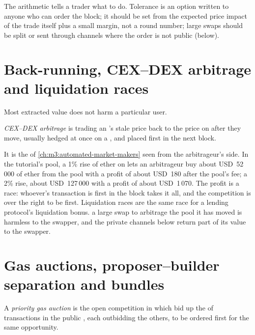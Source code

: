 The arithmetic tells a trader what to do. Tolerance is an option written to anyone who can order the block; it should be set from the
expected price impact of the trade itself plus a small margin, not a round number; large swaps should be split or sent through channels
where the order is not public (below).

\section{Back-running, CEX--DEX arbitrage and liquidation races}

Most extracted value does not harm a particular user.

\begin{definition}\label{def:m3:maximal-extractable-value:cexdex}
\emph{CEX--DEX arbitrage} is trading an 's stale price back to the price on  after they move, usually hedged at once on a , and placed first in the next block.
\end{definition}

It is the  of \cref{ch:m3:automated-market-makers} seen from the arbitrageur's side. In the tutorial's pool, a 1\%
rise of ether on  lets an arbitrageur buy about USD~52\,000 of ether from the pool with a profit of about USD~180
after the pool's fee; a 2\% rise, about USD~127\,000 with a profit of about USD~1\,070. The profit is a race: whoever's transaction is first
in the block takes it all, and the competition is over the right to be first. Liquidation races are the same race for a lending protocol's
liquidation bonus.  a large swap to arbitrage the pool it has moved is harmless to the swapper, and the private channels below
return part of its value to the swapper.

\section{Gas auctions, proposer--builder separation and bundles}

\begin{definition}\label{def:m3:maximal-extractable-value:pga}
A \emph{priority gas auction} is the open competition in which  bid up the  of transactions in
the public , each outbidding the others, to be ordered first for the same opportunity.
\end{definition}

